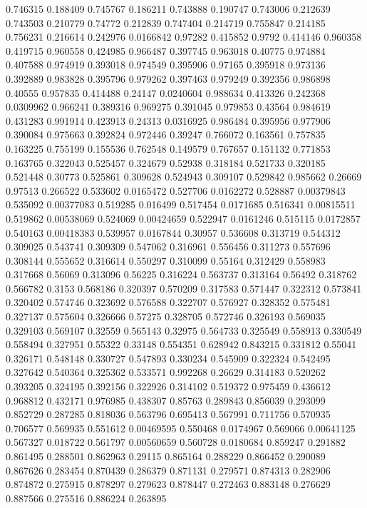0.746315 0.188409
0.745767 0.186211
0.743888 0.190747
0.743006 0.212639
0.743503 0.210779
0.74772 0.212839
0.747404 0.214719
0.755847 0.214185
0.756231 0.216614
0.242976 0.0166842
0.97282 0.415852
0.9792 0.414146
0.960358 0.419715
0.960558 0.424985
0.966487 0.397745
0.963018 0.40775
0.974884 0.407588
0.974919 0.393018
0.974549 0.395906
0.97165 0.395918
0.973136 0.392889
0.983828 0.395796
0.979262 0.397463
0.979249 0.392356
0.986898 0.40555
0.957835 0.414488
0.24147 0.0240604
0.988634 0.413326
0.242368 0.0309962
0.966241 0.389316
0.969275 0.391045
0.979853 0.43564
0.984619 0.431283
0.991914 0.423913
0.24313 0.0316925
0.986484 0.395956
0.977906 0.390084
0.975663 0.392824
0.972446 0.39247
0.766072 0.163561
0.757835 0.163225
0.755199 0.155536
0.762548 0.149579
0.767657 0.151132
0.771853 0.163765
0.322043 0.525457
0.324679 0.52938
0.318184 0.521733
0.320185 0.521448
0.30773 0.525861
0.309628 0.524943
0.309107 0.529842
0.985662 0.26669
0.97513 0.266522
0.533602 0.0165472
0.527706 0.0162272
0.528887 0.00379843
0.535092 0.00377083
0.519285 0.016499
0.517454 0.0171685
0.516341 0.00815511
0.519862 0.00538069
0.524069 0.00424659
0.522947 0.0161246
0.515115 0.0172857
0.540163 0.00418383
0.539957 0.0167844
0.30957 0.536608
0.313719 0.544312
0.309025 0.543741
0.309309 0.547062
0.316961 0.556456
0.311273 0.557696
0.308144 0.555652
0.316614 0.550297
0.310099 0.55164
0.312429 0.558983
0.317668 0.56069
0.313096 0.56225
0.316224 0.563737
0.313164 0.56492
0.318762 0.566782
0.3153 0.568186
0.320397 0.570209
0.317583 0.571447
0.322312 0.573841
0.320402 0.574746
0.323692 0.576588
0.322707 0.576927
0.328352 0.575481
0.327137 0.575604
0.326666 0.57275
0.328705 0.572746
0.326193 0.569035
0.329103 0.569107
0.32559 0.565143
0.32975 0.564733
0.325549 0.558913
0.330549 0.558494
0.327951 0.55322
0.33148 0.554351
0.628942 0.843215
0.331812 0.55041
0.326171 0.548148
0.330727 0.547893
0.330234 0.545909
0.322324 0.542495
0.327642 0.540364
0.325362 0.533571
0.992268 0.26629
0.314183 0.520262
0.393205 0.324195
0.392156 0.322926
0.314102 0.519372
0.975459 0.436612
0.968812 0.432171
0.976985 0.438307
0.85763 0.289843
0.856039 0.293099
0.852729 0.287285
0.818036 0.563796
0.695413 0.567991
0.711756 0.570935
0.706577 0.569935
0.551612 0.00469595
0.550468 0.0174967
0.569066 0.00641125
0.567327 0.018722
0.561797 0.00560659
0.560728 0.0180684
0.859247 0.291882
0.861495 0.288501
0.862963 0.29115
0.865164 0.288229
0.866452 0.290089
0.867626 0.283454
0.870439 0.286379
0.871131 0.279571
0.874313 0.282906
0.874872 0.275915
0.878297 0.279623
0.878447 0.272463
0.883148 0.276629
0.887566 0.275516
0.886224 0.263895

